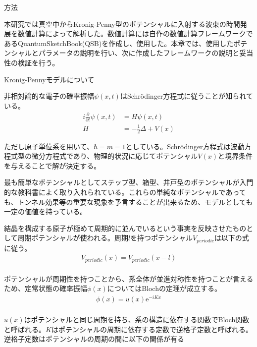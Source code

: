 \documentclass[a4paper, lualatex]{bxjsarticle}
\begin{document}
\begin{section}{方法}
    \par 本研究では真空中からKronig-Penny型のポテンシャルに入射する波束の時間発展を数値計算によって解析した。数値計算には自作の数値計算フレームワークであるQuantumSketchBook(QSB)を作成し、使用した。本章では、使用したポテンシャルとパラメータの説明を行い、次に作成したフレームワークの説明と妥当性の検証を行う。
    \begin{subsection}{Kronig-Pennyモデルについて}
        \par 非相対論的な電子の確率振幅$\psi(x,t)$はSchrödinger方程式に従うことが知られている。
        \begin{align}
         i \frac{\partial}{\partial t}\psi(x, t) &= H \psi(x, t)\nonumber\\
             H &= -\frac{1}{2}\Delta + V(x)
        \end{align}
        \par ただし原子単位系を用いて、$\hbar=m=1$としている。Schrödinger方程式は波動方程式型の微分方程式であり、物理的状況に応じてポテンシャル$V(x)$と境界条件を与えることで解が決定する。
        \par 最も簡単なポテンシャルとしてステップ型、箱型、井戸型のポテンシャルが入門的な教科書によく取り入れられている。これらの単純なポテンシャルであっても、トンネル効果等の重要な現象を予言することが出来るため、モデルとしても一定の価値を持っている。
        \par 結晶を構成する原子が極めて周期的に並んでいるという事実を反映させたものとして周期ポテンシャルが使われる。周期$l$を持つポテンシャル$V_{periodic}$は以下の式に従う。
        \begin{align}
         V_{periodic}(x)=V_{periodic}(x-l)\nonumber\\
        \end{align}
        \par ポテンシャルが周期性を持つことから、系全体が並進対称性を持つことが言えるため、定常状態の確率振幅$\phi(x)$についてはBlochの定理が成立する。
            \begin{align}
             \phi(x)=u(x)\mathrm{e}^{-iKx}\nonumber\\
            \end{align}
        \end{subsection}
        \par $u(x)$はポテンシャルと同じ周期を持ち、系の構造に依存する関数でBloch関数と呼ばれる。$K$はポテンシャルの周期に依存する定数で逆格子定数と呼ばれる。逆格子定数はポテンシャルの周期の間に以下の関係が有る

\end{section}
\end{document}
